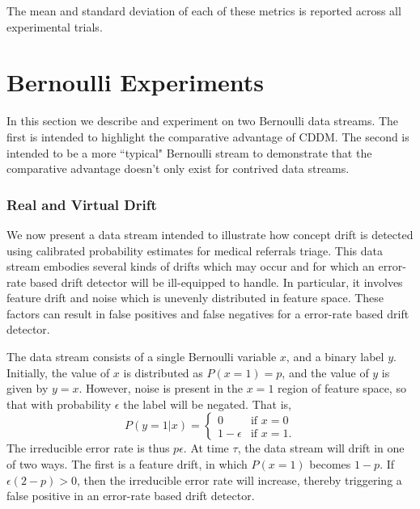 The mean and standard deviation of each of these metrics is reported across all experimental trials. 


\section{Bernoulli Experiments} \label{Experiments:bernoulli}

In this section we describe and experiment on two Bernoulli data streams. The first is intended to highlight the comparative advantage of CDDM. The second is intended to be a more ``typical" Bernoulli stream to demonstrate that the comparative advantage doesn't only exist for contrived data streams.

\subsubsection{Real and Virtual Drift}

We now present a data stream intended to illustrate how concept drift is detected using calibrated probability estimates for medical referrals triage.  This data stream embodies several kinds of drifts which may occur and for which an error-rate based drift detector will be ill-equipped to handle. In particular, it involves feature drift and noise which is unevenly distributed in feature space. These factors can result in false positives and false negatives for a error-rate based drift detector.

The data stream consists of a single Bernoulli variable $x$, and a binary label $y$. Initially, the value of $x$ is distributed as $P(x=1)=p$, and the value of $y$ is given by $y=x$. However, noise is present in the $x=1$ region of feature space, so that with probability $\epsilon$ the label will be negated. That is,
\begin{equation}
	P(y=1|x) = \begin{cases} 0 & \text{if $x=0$} \\ 1-\epsilon & \text{if $x=1$}. \end{cases}
\end{equation}
The irreducible error rate is thus $p\epsilon$. At time $\tau$, the data stream will drift in one of two ways. The first is a feature drift, in which $P(x=1)$ becomes $1-p$. If $\epsilon(2-p)>0$, then the irreducible error rate will increase, thereby triggering a false positive in an error-rate based drift detector. 

